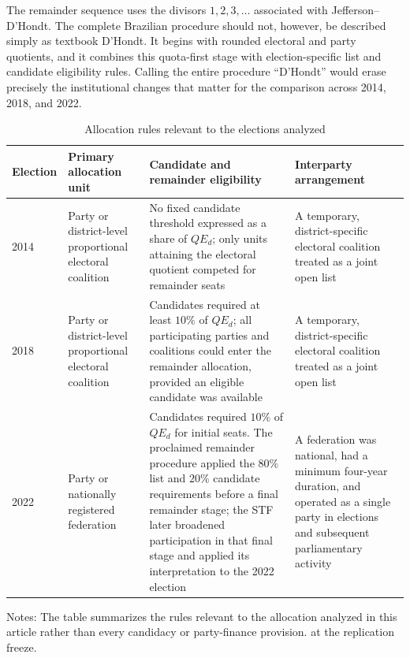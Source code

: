 \documentclass[11pt]{article}
\begin{document}
The remainder sequence uses the divisors \(1,2,3,\ldots\) associated with
Jefferson--D'Hondt. The complete Brazilian procedure should not, however,
be described simply as textbook D'Hondt. It begins with rounded electoral
and party quotients, and it combines this quota-first stage with
election-specific list and candidate eligibility rules. Calling the entire
procedure ``D'Hondt'' would erase precisely the institutional changes that
matter for the comparison across 2014, 2018, and 2022.

\begin{table}[htbp]
\centering
\caption{Allocation rules relevant to the elections analyzed}
\label{tab:allocation-rules}
\footnotesize
\renewcommand{\arraystretch}{1.15}
\begin{tabularx}{\textwidth}{@{}lXXX@{}}
\toprule
Election & Primary allocation unit & Candidate and remainder eligibility
& Interparty arrangement \\
\midrule
2014
& Party or district-level proportional electoral coalition
& No fixed candidate threshold expressed as a share of \(QE_d\);
only units attaining the electoral quotient competed for remainder seats
& A temporary, district-specific electoral coalition treated as a joint open list \\

2018
& Party or district-level proportional electoral coalition
& Candidates required at least \(10\%\) of \(QE_d\); all participating
parties and coalitions could enter the remainder allocation, provided an
eligible candidate was available
& A temporary, district-specific electoral coalition treated as a joint open list \\

2022
& Party or nationally registered federation
& Candidates required \(10\%\) of \(QE_d\) for initial seats. The proclaimed
remainder procedure applied the \(80\%\) list and \(20\%\) candidate
requirements before a final remainder stage; the STF later broadened
participation in that final stage and applied its interpretation to the 2022
election
& A federation was national, had a minimum four-year duration, and operated
as a single party in elections and subsequent parliamentary activity \\
\bottomrule
\end{tabularx}
\begin{flushleft}
\scriptsize
Notes: The table summarizes the rules relevant to the allocation analyzed in
this article rather than every candidacy or party-finance provision.
at the replication freeze.
\end{flushleft}
\end{table}
\end{document}
